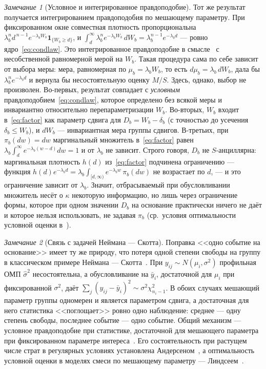 \documentclass[11pt,a4paper]{article}
\theoremstyle{plain}
\theoremstyle{remark}
\newtheorem{remark}{Замечание}
\begin{document}
\begin{remark}[Условное и интегрированное правдоподобие]\label{rem:integrated}
Тот же результат получается интегрированием правдоподобия по мешающему
параметру. При фиксированном окне совместная плотность пропорциональна
$\lambda_b^{n}d^{\,n-1}e^{-\lambda_bW_b}\mathbf 1_{\{W_b\ge d\}}$, и
$\int_d^\infty\lambda_b^{n}e^{-\lambda_bW_b}\,dW_b=\lambda_b^{n-1}e^{-\lambda_bd}$ ---
ровно ядро~\eqref{eq:condlaw}. Это интегрированное правдоподобие в
смысле~\cite{berger1999} с несобственной равномерной мерой на $W_b$. Такая
процедура сама по себе зависит от выбора меры: мера, равномерная по
$\mu_b=\lambda_bW_b$, то есть $d\mu_b=\lambda_b\,dW_b$, дала бы
$\lambda_b^{n}e^{-\lambda_bd}$ и вернула бы несостоятельную оценку $M/S$. Здесь, однако,
выбор не произволен. Во-первых, результат совпадает с \emph{условным}
правдоподобием~\eqref{eq:condlaw}, которое определено без всякой меры и
инвариантно относительно перепараметризации $W_b$. Во-вторых, $W_b$ входит
в~\eqref{eq:factor} как параметр сдвига для $D_b=W_b-\delta_b$ (с точностью до
усечения $\delta_b\le W_b$), и $dW_b$ ---
инвариантная мера группы сдвигов. В-третьих, при $\pi_b(dw)=dw$ маргинальный
множитель в~\eqref{eq:factor} равен $\lambda_b\int_d^\infty e^{-\lambda_b(w-d)}dw=1$
и от $\lambda_b$ не зависит. Строго говоря, $D_b$ не $S$-анциллярна:
маргинальная плотность $h(d)$ из~\eqref{eq:factor} подчинена ограничению ---
функция $h(d)e^{-\lambda_bd}=\lambda_b\int_{[d,\infty)}e^{-\lambda_bw}\,\pi_b(dw)$
не возрастает по $d$, --- и это ограничение зависит от $\lambda_b$. Значит,
отбрасываемый при обусловливании множитель несёт о $\kappa$ некоторую информацию,
но лишь через ограничение формы, которое при одном значении $D_b$ на основание
практически ничего не даёт и которое нельзя использовать, не задавая $\pi_b$
(ср.\ условия оптимальности условной оценки в~\cite{lindsay1980}).
\end{remark}

\begin{remark}[Связь с задачей Неймана --- Скотта]\label{rem:neymanscott}
Поправка <<одно событие на основание>> имеет ту же природу, что потеря одной
степени свободы на группу в классическом примере Неймана ---
Скотта~\cite{neymanscott1948}. При $y_{ij}\sim N(\mu_i,\sigma^2)$ профильная ОМП
$\hat\sigma^2$ несостоятельна, а обусловливание на $\bar y_i$, достаточной для
$\mu_i$ при фиксированной $\sigma^2$, даёт
$\sum_j(y_{ij}-\bar y_i)^2\sim\sigma^2\chi^2_{n_i-1}$. В обоих случаях мешающий
параметр группы одномерен и является параметром сдвига, а достаточная для него
статистика <<поглощает>> ровно одно наблюдение: среднее --- одну степень свободы,
последнее событие --- одно событие. Общий механизм --- условное правдоподобие при
статистике, достаточной для мешающего параметра при фиксированном параметре
интереса~\cite{kalbfleischsprott1970}. Его состоятельность при растущем числе
страт в регулярных условиях установлена Андерсеном~\cite{andersen1970}, а
оптимальность условной оценки в моделях смеси по мешающему параметру ---
Линдсеем~\cite{lindsay1980}.
\end{remark}
\end{document}
